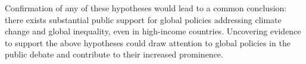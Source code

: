 \begin{bibunit}


Confirmation of any of these hypotheses would lead to a common conclusion: there exists substantial public support for global policies addressing climate change and global inequality, even in high-income countries. %
Uncovering evidence to support the above hypotheses could %
draw attention to global policies in the public debate and contribute to their increased prominence. %


\end{bibunit}
